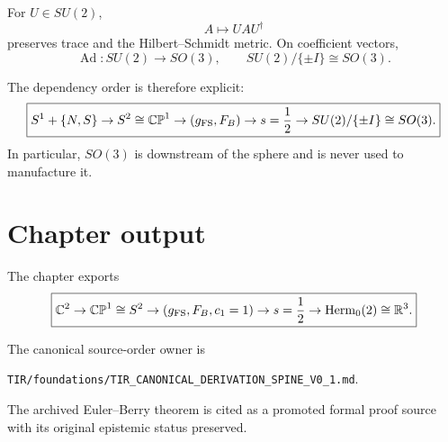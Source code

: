 For $U\in SU(2)$,
\begin{equation}
A\mapsto UAU^\dagger
\end{equation}
preserves trace and the Hilbert--Schmidt metric. On coefficient vectors,
\begin{equation}
\boxed{
\operatorname{Ad}:SU(2)\to SO(3),
\qquad
SU(2)/\{\pm I\}\cong SO(3).
}
\label{eq:v12_su2_so3}
\end{equation}

The dependency order is therefore explicit:
\begin{equation}
\boxed{
S^1+\{N,S\}
\to
S^2
\cong
\mathbb{CP}^1
\to
(g_{\rm FS},F_B)
\to
s=\frac12
\to
SU(2)/\{\pm I\}
\cong
SO(3).
}
\label{eq:v12_ch3_dependency}
\end{equation}
In particular, $SO(3)$ is downstream of the sphere and is never used to manufacture it.

\section{Chapter output}

The chapter exports
\begin{equation}
\boxed{
\mathbb C^2
\to
\mathbb{CP}^1\cong S^2
\to
(g_{\rm FS},F_B,c_1=1)
\to
s=\frac12
\to
\operatorname{Herm}_0(2)\cong\mathbb R^3.
}
\end{equation}

The canonical source-order owner is
\begin{center}
\texttt{TIR/foundations/TIR\_CANONICAL\_DERIVATION\_SPINE\_V0\_1.md}.
\end{center}
The archived Euler--Berry theorem is cited as a promoted formal proof source with its original epistemic status preserved.
